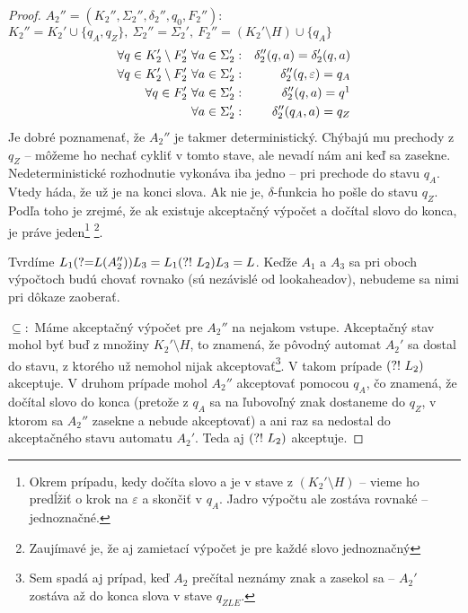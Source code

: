 \begin{proof}
$A_2''= (K_2'',\Sigma_2'',\delta_2'',q_{0},F_2'')$: $K_2'' = K_2' \cup \lbrace q_A, q_Z \rbrace, ~\Sigma_2'' = \Sigma_2', ~F_2'' = (K_2'\setminus H) \cup \lbrace q_A \rbrace$
\begin{eqnarray*}
 \forall q \in K_2' \setminus F_2'  ~ \forall a \in \Sigma_2' &:&  \delta_2''(q,a)=\delta_2'(q,a) \\
 \forall q \in K_2' \setminus F_2'  ~ \forall a \in \Sigma_2' &:&  \delta_2''(q,\varepsilon)=q_A \\
 \forall q \in F_2' ~ \forall a \in \Sigma_2' &:& \delta_2''(q,a)=q \footnotemark \\
 \forall a \in \Sigma_2' &:& \delta_2''(q_A,a)=q_Z 
\end{eqnarray*}
Je dobré poznamenať, že $A_2''$ je takmer deterministický. Chýbajú mu prechody z $q_Z$ -- môžeme ho nechať cykliť v tomto stave, ale nevadí nám ani keď sa zasekne. Nedeterministické rozhodnutie vykonáva iba jedno -- pri prechode do stavu $q_A$. Vtedy háda, že už je na konci slova. Ak nie je, $\delta$-funkcia ho pošle do stavu $q_Z$. Podľa toho je zrejmé, že ak existuje akceptačný výpočet a dočítal slovo do konca, je práve jeden\footnote{Okrem prípadu, kedy dočíta slovo a je v stave z $(K_2'\setminus H)$ -- vieme ho predĺžiť o krok na $\varepsilon$ a skončiť v $q_A$. Jadro výpočtu ale zostáva rovnaké -- jednoznačné.} \footnote{Zaujímavé je, že aj zamietací výpočet je pre každé slovo jednoznačný}.

Tvrdíme $ L_1\text{(?=} L(A_2''))L_3 =L_1\text{(?!~} L_2)L_3= L $.
Keďže $A_1$ a $A_3$ sa pri oboch výpočtoch budú chovať rovnako (sú nezávislé od lookaheadov), nebudeme sa nimi pri dôkaze zaoberať.

$\subseteq :$ Máme akceptačný výpočet pre $A_2''$ na nejakom vstupe. Akceptačný stav mohol byť buď z množiny $K_2'\setminus H$, to znamená, že pôvodný automat $A_2'$ sa dostal do stavu, z ktorého už nemohol nijak akceptovať\footnote{Sem spadá aj prípad, keď $A_2$ prečítal neznámy znak a zasekol sa -- $A_2'$ zostáva až do konca slova v stave $q_{ZLE}$.}. V takom prípade $\text{(?!~} L_2)$ akceptuje. V druhom prípade mohol $A_2''$ akceptovať pomocou $q_A$, čo znamená, že dočítal slovo do konca (pretože z $q_A$ sa na ľubovoľný znak dostaneme do $q_Z$, v ktorom sa $A_2''$ zasekne a nebude akceptovať) a ani raz sa nedostal do akceptačného stavu automatu $A_2'$. Teda aj $\text{(?!~} L_2)$ akceptuje.


\end{proof}
